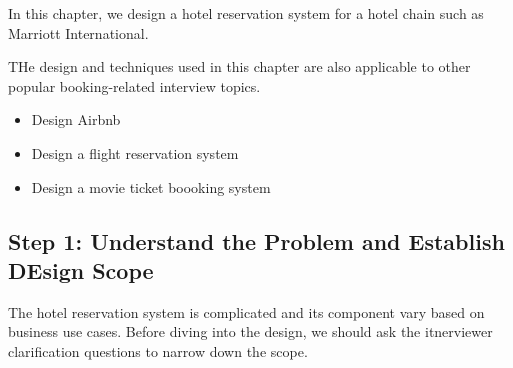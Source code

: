 \documentclass{report}
\theoremstyle{definition}
\let\oldsubsection\subsection
\renewcommand{\subsection}{\oldsubsection*}
\begin{document}
In this chapter, we design a hotel reservation system for a hotel chain such as Marriott International.

THe design and techniques used in this chapter are also applicable to other popular booking-related interview topics.


\begin{itemize}
\item
Design Airbnb
\item
Design a flight reservation system
\item
Design a movie ticket boooking system
\end{itemize}

\subsection{Step 1: Understand the Problem and Establish DEsign Scope}

The hotel reservation system is complicated and its component vary based on business use cases. Before diving into the design, we should ask the itnerviewer clarification questions to narrow down the scope.
\end{document}
